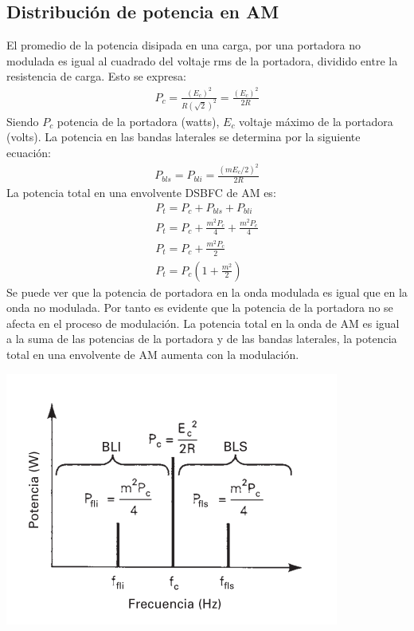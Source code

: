 \documentclass[10pt,a4paper]{article}
\begin{document}
\subsection{Distribución de potencia en AM}
El promedio de la potencia disipada en una carga, por una portadora no modulada es igual al cuadrado del voltaje rms de la portadora, dividido entre la resistencia de carga. Esto se expresa:
\begin{align}
	P_c=\frac{(E_c)^2}{R(\sqrt{2})^2}=\frac{(E_c)^2}{2R}
\end{align}
Siendo $P_c$ potencia de la portadora (watts), $E_c$ voltaje máximo de la portadora (volts).
La potencia en las bandas laterales se determina por la siguiente ecuación:
\begin{align}
	P_{bls}=P_{bli}=\frac{(mE_c/2)^2}{2R}
\end{align}
La potencia total en una envolvente DSBFC de AM es:
\begin{align}
	P_t=P_c+P_{bls}+P_{bli}                   \\
	P_t=P_c+\frac{m^2P_c}{4}+\frac{m^2P_c}{4} \\
	P_t=P_c+\frac{m^2P_c}{2}                  \\
	P_t=P_c\left(1+\frac{m^2}{2}\right)
\end{align}
Se puede ver que la potencia de portadora en la onda modulada es igual que en la onda no modulada. Por tanto es evidente que la potencia de la portadora no se afecta en el proceso de modulación. La potencia total en la onda de AM es igual a la suma de las potencias de la portadora y de las bandas laterales, la potencia total en una envolvente de AM aumenta con la modulación.

\begin{center}
	\includegraphics[scale=0.5]{screenshot003}
\end{center}
\end{document}
